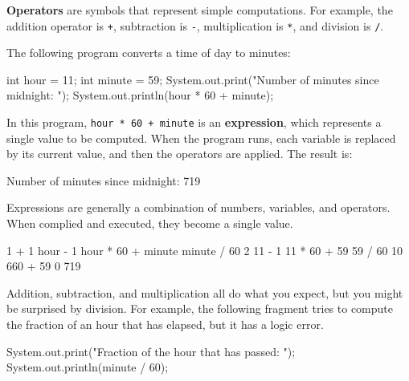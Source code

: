 \documentclass[12pt]{book}
\theoremstyle{exercise}
\newcommand{\java}[1]{\verb"#1"}
\newcommand{\java}[1]{\lstinline{#1}} %
\begin{document}


{\bf Operators} are symbols that represent simple computations.
For example, the addition operator is \java{+}, subtraction is \java{-}, multiplication is \java{*}, and division is \java{/}.

The following program converts a time of day to minutes:

\begin{code}
    int hour = 11;
    int minute = 59;
    System.out.print("Number of minutes since midnight: ");
    System.out.println(hour * 60 + minute);
\end{code}


In this program, \java{hour * 60 + minute} is an {\bf expression}, which represents a single value to be computed.
When the program runs, each variable is replaced by its current value, and then the operators are applied.
The result is:

\begin{stdout}
Number of minutes since midnight: 719
\end{stdout}

Expressions are generally a combination of numbers, variables, and operators.
When complied and executed, they become a single value.

\begin{code}
    1 + 1     hour - 1     hour * 60 + minute     minute / 60
    2         11 - 1       11 * 60 + 59           59 / 60
              10           660 + 59               0
                           719
\end{code}

Addition, subtraction, and multiplication all do what you expect, but you might be surprised by division.
For example, the following fragment tries to compute the fraction of an hour that has elapsed, but it has a logic error.

\begin{code}
    System.out.print("Fraction of the hour that has passed: ");
    System.out.println(minute / 60);
\end{code}
\end{document}
